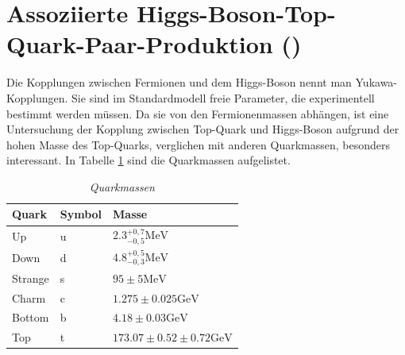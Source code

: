 \section{Assoziierte Higgs-Boson-Top-Quark-Paar-Produktion (\ttH)}
\label{ch:Theorie:sec:ttH}

Die Kopplungen zwischen Fermionen und dem Higgs-Boson nennt man Yukawa-Kopplungen.
Sie sind im Standardmodell freie Parameter, die experimentell bestimmt werden m\"ussen. Da sie von den Fermionenmassen abh\"angen, ist eine Untersuchung der Kopplung zwischen Top-Quark und Higgs-Boson aufgrund der hohen Masse des Top-Quarks, verglichen mit anderen Quarkmassen, besonders interessant. In Tabelle \ref{tab:quarkmasse} sind die Quarkmassen aufgelistet.\\

\begin{table}[hhh]\parbox{12cm}{
  \caption[Quarkmassen]{\it Quarkmassen {\rm \cite{Agashe:2014kda}}
  }\label{tab:quarkmasse}}
  \begin{center}
  \begin{tabular}{lll}
  \hline
  {\bf Quark} & {\bf Symbol} & {\bf Masse}  \\
  \hline \hline
     Up		& u & $\num{2,3}^{{+0,7}}_{{-0,5}}\si{\mega\electronvolt}$ \\
     Down	& d & $\num{4,8}^{{+0,5}}_{{-0,3}}\si{\mega\electronvolt}$ \\
     Strange& s & $\num{95}\pm \num{5}\si{\mega\electronvolt}$ \\
     Charm	& c & $\num{1,275}\pm \num{0,025}\si{\giga\electronvolt}$ \\ 
  	 Bottom & b & $\num{4,18}\pm \num{0,03}\si{\giga\electronvolt}$ \\
     Top    & t & $\num{173,07}\pm \num{0,52}\pm \num{0,72}\si{\giga\electronvolt}$\\                                
  \hline
  \end{tabular}
  \end{center}
\end{table}

